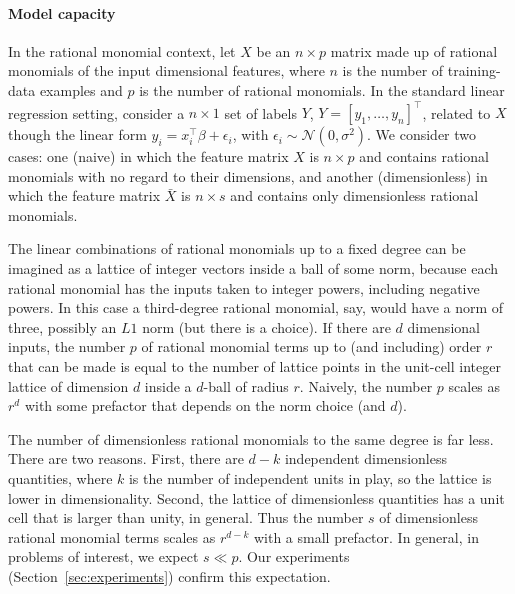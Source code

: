 \documentclass[twoside,11pt]{article}
\newcommand{\sectionname}{Section}
\newcommand{\secref}[1]{\sectionname~\ref{#1}}
\begin{document}
\paragraph{Model capacity}
In the rational monomial context, let $X$ be an  $n\times p$ matrix made up of rational monomials of the input dimensional features, where $n$ is the number of training-data examples and $p$ is the number of rational monomials. In the standard linear regression setting, consider a $n\times 1$ set of labels $Y$, $Y = [y_1, \ldots, y_n]^\top$, related to $X$ though the linear form $y_i = x_i^\top \beta + \epsilon_i$, with $\epsilon_i \sim \mathcal{N}(0, \sigma^2)$. We  consider two cases: one (naive) in which the feature matrix $X$ is $n\times p$ and contains rational monomials with no regard to their dimensions, and another (dimensionless) in which the feature matrix $\bar{X}$ is $n\times s$ and contains only dimensionless rational monomials.


The linear combinations of rational monomials up to a fixed degree can be imagined as a lattice of integer vectors inside a ball of some norm, because each rational monomial has the inputs taken to integer powers, including negative powers.
In this case a third-degree rational monomial, say, would have a norm of three, possibly an $L1$ norm (but there is a choice).
If there are $d$ dimensional inputs, the number $p$ of rational monomial terms up to (and including) order $r$ that can be made is equal to the number of lattice points in the unit-cell integer lattice of dimension $d$ inside a $d$-ball of radius $r$.
Naively, the number $p$ scales as $r^d$ with some prefactor that depends on the norm choice (and $d$).

The number of dimensionless rational monomials to the same degree is far less.
There are two reasons. First, there are $d-k$ independent dimensionless quantities, where $k$ is the number of independent units in play, so the lattice is lower in dimensionality. Second, the lattice of dimensionless quantities has a unit cell that is larger than unity, in general. Thus the number $s$ of dimensionless rational monomial terms scales as $r^{d-k}$ with a small prefactor.
In general, in problems of interest, we expect $s\ll p$.
Our experiments (\secref{sec:experiments}) confirm this expectation.


\end{document}
